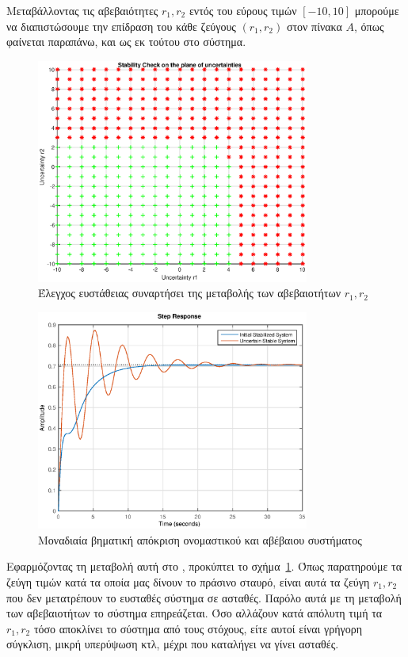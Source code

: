 Μεταβάλλοντας τις αβεβαιότητες \( r_1, r_2 \) εντός του εύρους τιμών \( [-10,
10] \) μπορούμε να διαπιστώσουμε την επίδραση του κάθε ζεύγους \( (r_1, r_2) \)
στον πίνακα \( A \), όπως φαίνεται παραπάνω, και ως εκ τούτου στο σύστημα.
\begin{figure}[h!]
    \centering
    \includegraphics[width=0.8\textwidth]{figures/uncert_r.eps}
    \caption{Έλεγχος ευστάθειας συναρτήσει της μεταβολής των αβεβαιοτήτων
        \( r_1, r_2 \)}
    \label{fig:uncert_r}
\end{figure}
\begin{figure}[h!]
    \centering
    \includegraphics[width=0.8\textwidth]{figures/uncert_step.eps}
    \caption{Μοναδιαία βηματική απόκριση ονομαστικού και αβέβαιου συστήματος}
    \label{fig:uncert_step}
\end{figure}

Εφαρμόζοντας τη μεταβολή αυτή στο , προκύπτει το σχήμα~\ref{fig:uncert_r}.
Όπως παρατηρούμε τα ζεύγη τιμών κατά τα οποία μας δίνουν το πράσινο σταυρό,
είναι αυτά τα ζεύγη \( r_1, r_2 \) που δεν μετατρέπουν το ευσταθές σύστημα σε ασταθές.
Παρόλο αυτά με τη μεταβολή των αβεβαιοτήτων το σύστημα επηρεάζεται. Όσο αλλάζουν κατά
απόλυτη τιμή τα \( r_1, r_2 \) τόσο αποκλίνει το σύστημα από τους στόχους, είτε αυτοί είναι
γρήγορη σύγκλιση, μικρή υπερύψωση κτλ, μέχρι που καταλήγει να γίνει ασταθές.

